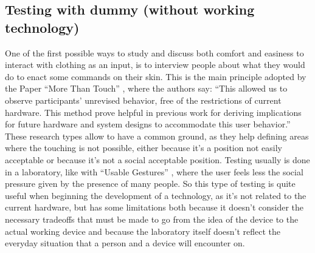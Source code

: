 \documentclass{sigchi}
\begin{document}
\subsection{Testing with dummy (without working technology)}
One of the first possible ways to study and discuss both comfort and easiness  to interact with clothing as an input, is to interview people about what they would do to enact some commands on their skin. This is the main principle adopted by the Paper ``More Than Touch'' \cite[p. 181]{more-touch}, where the authors say: ``This allowed us to observe participants’ unrevised behavior, free of the restrictions of current hardware. This method prove helpful in previous work for deriving implications for future hardware and system designs to accommodate this user behavior.''
These research types allow to have a common ground, as they help defining areas where the touching is not possible, either because it’s a position not easily acceptable or because it’s not a social acceptable position. Testing usually is done in a laboratory, like with ``Usable Gestures'' \cite{usable-gesture}, where the user feels less the social pressure given by the presence of many people. So this type of testing is quite useful when beginning the development of a technology, as it’s not related to the current hardware, but has some limitations both because it doesn’t consider the necessary tradeoffs that must be made to go from the idea of the device to the actual working device and because the laboratory itself doesn’t reflect the everyday situation that a person and a device will encounter on.
\end{document}
